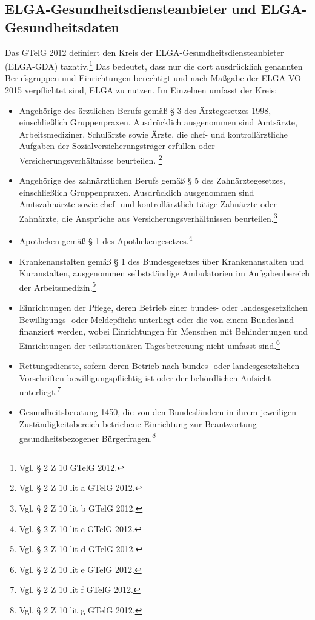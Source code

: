         \subsection{ELGA-Gesundheitsdiensteanbieter und ELGA-Gesundheitsdaten}
Das GTelG 2012 definiert den Kreis der ELGA-Gesundheitsdiensteanbieter (ELGA-GDA) taxativ.\footnote{Vgl. § 2 Z 10 GTelG 2012.} Das bedeutet, dass nur die dort ausdrücklich genannten Berufsgruppen und Einrichtungen berechtigt und nach Maßgabe der ELGA-VO 2015 verpflichtet  sind, ELGA zu nutzen. Im Einzelnen umfasst der Kreis:
\begin{itemize}
    \item Angehörige des ärztlichen Berufs gemäß § 3 des Ärztegesetzes 1998, einschließlich Gruppenpraxen. Ausdrücklich ausgenommen sind Amtsärzte, Arbeitsmediziner, Schulärzte sowie Ärzte, die chef- und kontrollärztliche Aufgaben der Sozialversicherungsträger erfüllen oder Versicherungsverhältnisse beurteilen. \footnote{Vgl. § 2 Z 10 lit a GTelG 2012.}
    \item Angehörige des zahnärztlichen Berufs gemäß § 5 des Zahnärztegesetzes, einschließlich Gruppenpraxen. Ausdrücklich ausgenommen sind Amtszahnärzte sowie chef- und kontrollärztlich tätige Zahnärzte oder Zahnärzte, die Ansprüche aus Versicherungsverhältnissen beurteilen.\footnote{Vgl. § 2 Z 10 lit b GTelG 2012.}
    \item Apotheken gemäß § 1 des Apothekengesetzes.\footnote{Vgl. § 2 Z 10 lit c GTelG 2012.}
    \item Krankenanstalten gemäß § 1 des Bundesgesetzes über Krankenanstalten und Kuranstalten, ausgenommen selbstständige Ambulatorien im Aufgabenbereich der Arbeitsmedizin.\footnote{Vgl. § 2 Z 10 lit d GTelG 2012.}
    \item Einrichtungen der Pflege, deren Betrieb einer bundes- oder landesgesetzlichen Bewilligungs- oder Meldepflicht unterliegt oder die von einem Bundesland finanziert werden, wobei Einrichtungen für Menschen mit Behinderungen und Einrichtungen der teilstationären Tagesbetreuung nicht umfasst sind.\footnote{Vgl. § 2 Z 10 lit e GTelG 2012.}
    \item Rettungsdienste, sofern deren Betrieb nach bundes- oder landesgesetzlichen Vorschriften bewilligungspflichtig ist oder der behördlichen Aufsicht unterliegt.\footnote{Vgl. § 2 Z 10 lit f GTelG 2012.}
    \item Gesundheitsberatung 1450, die von den Bundesländern in ihrem jeweiligen Zuständigkeitsbereich betriebene Einrichtung zur Beantwortung gesundheitsbezogener Bürgerfragen.\footnote{Vgl. § 2 Z 10 lit g GTelG 2012.}
    \end{itemize}

